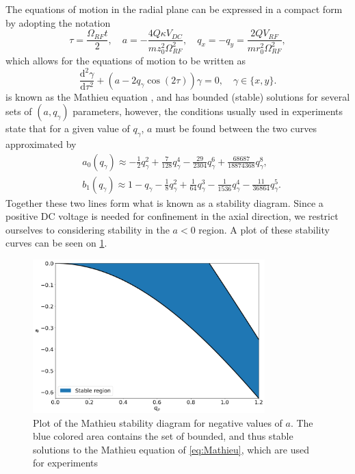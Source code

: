 The equations of motion in the radial plane can be expressed in a compact form by adopting the notation
\begin{equation}
    \tau = \frac{\Omega_{RF}t}{2},\quad a = -\frac{4Q\kappa V_{DC}}{mz_0^2\Omega_{RF}^2},\quad q_x = -q_y = 
    \frac{2QV_{RF}}{mr_0^2\Omega_{RF}^2},
\end{equation}
which allows for the equations of motion to be written as
\begin{equation}
    \frac{\text{d}^2\gamma}{\text{d}\tau^2} + (a-2q_\gamma\cos{(2\tau)})\gamma = 0,\quad \gamma\in\{x,y\}
    \label{eq:Mathieu}.
\end{equation}
 is known as the Mathieu equation \cite{Abramowitz_1972}, and has bounded (stable) solutions for several sets of $(a,q_\gamma)$ parameters,
however, the conditions usually used in experiments state that for a given value of $q_\gamma$, $a$ must be found between the two curves approximated by \cite{Abramowitz_1972}
\begin{align}
    &a_0(q_\gamma) \approx -\frac{1}{2}q_\gamma^2 +\frac{7}{128}q_\gamma^4 -\frac{29}{2304}q_\gamma^6+\frac{68687}{18874368}q_\gamma^8,\\
    &b_1(q_\gamma) \approx 1-q_\gamma-\frac{1}{8}q_\gamma^2+\frac{1}{64}q_\gamma^3-\frac{1}{1536}q_\gamma^4-\frac{11}{36864}q_\gamma^5.
\end{align}
Together these two lines form what is known as a stability diagram. Since a positive DC voltage is needed for confinement in the axial direction, we restrict ourselves to considering stability in the $a<0$ region. A plot of these stability curves can be seen on \cref{fig:Stability1}.
\begin{figure}
    \centering
    \includegraphics[width =0.8\textwidth]{main/Stability.png}
    \caption{Plot of the Mathieu stability diagram for negative values of $a$. The blue colored area contains the set of bounded, and thus stable solutions to the Mathieu equation of \cref{eq:Mathieu}, which are used for experiments}
    \label{fig:Stability1}
\end{figure}

